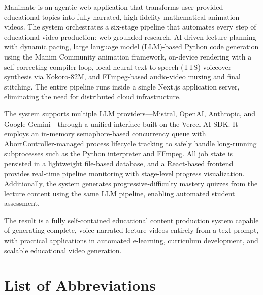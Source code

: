 \documentclass[12pt,a4paper,twoside,openright]{report}
\begin{document}
Manimate is an agentic web application that transforms user-provided educational topics into fully narrated, high-fidelity mathematical animation videos. The system orchestrates a six-stage pipeline that automates every step of educational video production: web-grounded research, AI-driven lecture planning with dynamic pacing, large language model (LLM)-based Python code generation using the Manim Community animation framework, on-device rendering with a self-correcting compiler loop, local neural text-to-speech (TTS) voiceover synthesis via Kokoro-82M, and FFmpeg-based audio-video muxing and final stitching. The entire pipeline runs inside a single Next.js application server, eliminating the need for distributed cloud infrastructure.

The system supports multiple LLM providers---Mistral, OpenAI, Anthropic, and Google Gemini---through a unified interface built on the Vercel AI SDK. It employs an in-memory semaphore-based concurrency queue with AbortController-managed process lifecycle tracking to safely handle long-running subprocesses such as the Python interpreter and FFmpeg. All job state is persisted in a lightweight file-based database, and a React-based frontend provides real-time pipeline monitoring with stage-level progress visualization. Additionally, the system generates progressive-difficulty mastery quizzes from the lecture content using the same LLM pipeline, enabling automated student assessment.

The result is a fully self-contained educational content production system capable of generating complete, voice-narrated lecture videos entirely from a text prompt, with practical applications in automated e-learning, curriculum development, and scalable educational video generation.

\cleardoublepage


\chapter*{List of Abbreviations}
\end{document}
